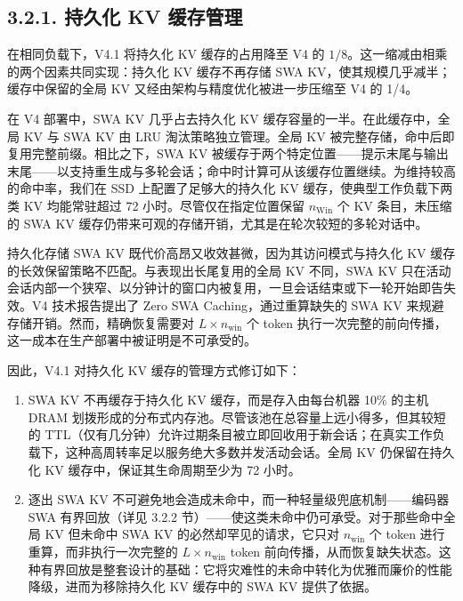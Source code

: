 \subsection{3.2.1. 持久化 KV 缓存管理}\label{persistent-kv-cache-management}

在相同负载下，V4.1 将持久化 KV 缓存的占用降至 V4 的 \(1 / 8\)。这一缩减由相乘的两个因素共同实现：持久化 KV 缓存不再存储 SWA KV，使其规模几乎减半；缓存中保留的全局 KV 又经由架构与精度优化被进一步压缩至 V4 的 1/4。

在 V4 部署中，SWA KV 几乎占去持久化 KV 缓存容量的一半。在此缓存中，全局 KV 与 SWA KV 由 LRU 淘汰策略独立管理。全局 KV 被完整存储，命中后即复用完整前缀。相比之下，SWA KV 被缓存于两个特定位置——提示末尾与输出末尾——以支持重生成与多轮会话；命中时计算可从该缓存位置继续。为维持较高的命中率，我们在 SSD 上配置了足够大的持久化 KV 缓存，使典型工作负载下两类 KV 均能常驻超过 72 小时。尽管仅在指定位置保留 \(n _ { \mathrm { W i n } }\) 个 KV 条目，未压缩的 SWA KV 缓存仍带来可观的存储开销，尤其是在轮次较短的多轮对话中。

持久化存储 SWA KV 既代价高昂又收效甚微，因为其访问模式与持久化 KV 缓存的长效保留策略不匹配。与表现出长尾复用的全局 KV 不同，SWA KV 只在活动会话内部一个狭窄、以分钟计的窗口内被复用，一旦会话结束或下一轮开始即告失效。V4 技术报告提出了 Zero SWA Caching，通过重算缺失的 SWA KV 来规避存储开销。然而，精确恢复需要对 \(L \times n _ { \mathrm { w i n } }\) 个 token 执行一次完整的前向传播，这一成本在生产部署中被证明是不可承受的。

因此，V4.1 对持久化 KV 缓存的管理方式修订如下：

\begin{enumerate}
\def\labelenumi{\arabic{enumi}.}
\item
  SWA KV 不再缓存于持久化 KV 缓存，而是存入由每台机器 10\% 的主机 DRAM 划拨形成的分布式内存池。尽管该池在总容量上远小得多，但其较短的 TTL（仅有几分钟）允许过期条目被立即回收用于新会话；在真实工作负载下，这种高周转率足以服务绝大多数并发活动会话。全局 KV 仍保留在持久化 KV 缓存中，保证其生命周期至少为 72 小时。
\item
  逐出 SWA KV 不可避免地会造成未命中，而一种轻量级兜底机制——编码器 SWA 有界回放（详见 3.2.2 节）——使这类未命中仍可承受。对于那些命中全局 KV 但未命中 SWA KV 的必然却罕见的请求，它只对 \(n _ { \mathrm { w i n } }\) 个 token 进行重算，而非执行一次完整的 \(L \times n _ { \mathrm { w i n } }\) token 前向传播，从而恢复缺失状态。这种有界回放是整套设计的基础：它将灾难性的未命中转化为优雅而廉价的性能降级，进而为移除持久化 KV 缓存中的 SWA KV 提供了依据。
\end{enumerate}



